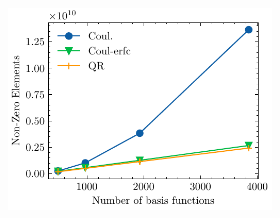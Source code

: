 \begin{figure}
\begin{subfigure}{\textwidth}
\begin{subfigure}{0.45\textwidth}
\centering
\includegraphics[width=\textwidth]{Pics/eri_nze_alkan}
\end{subfigure}
\hfill
\begin{subtable}{0.45\textwidth}
\centering
{}
\end{subtable}
\caption{}
\label{fig:GS_BNZE_ALKAN}
\end{subfigure}

\vspace{1.5\baselineskip}


\end{figure}
